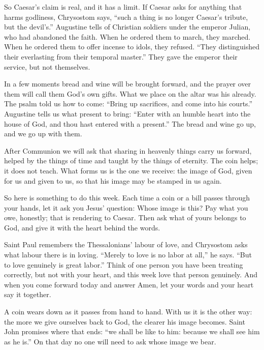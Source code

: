 So Caesar's claim is real, and it has a limit. If Caesar asks for anything
that harms godliness, Chrysostom says, ``such a thing is no longer Caesar's
tribute, but the devil's.'' Augustine tells of Christian soldiers under the
emperor Julian, who had abandoned the faith. When he ordered them to march,
they marched. When he ordered them to offer incense to idols, they refused.
``They distinguished their everlasting from their temporal master.'' They gave
the emperor their service, but not themselves.

\bigskip

In a few moments bread and wine will be brought forward, and the prayer over
them will call them God's own gifts. What we place on the altar was his
already. The psalm told us how to come: ``Bring up
sacrifices, and come into his courts.'' Augustine tells us what present to
bring: ``Enter with an humble heart into the house of God, and thou hast
entered with a present.'' The bread and wine go up, and we go up with them.

After Communion we will ask that sharing in heavenly things carry us forward,
helped by the things of time and taught by the things of eternity. The coin
helps; it does not teach. What forms us is the one we receive: the image of
God, given for us and given to us, so that his image may be stamped in us
again.

\bigskip

So here is something to do this week. Each time a coin or a bill passes
through your hands, let it ask you Jesus' question: Whose image is this? Pay
what you owe, honestly; that is rendering to Caesar. Then ask what of yours
belongs to God, and give it with the heart behind the words.

Saint Paul remembers the Thessalonians' labour of love, and Chrysostom asks
what labour there is in loving. ``Merely to love is no labor at all,'' he
says. ``But to love genuinely is great labor.'' Think of one person you have been treating correctly, but not with
your heart, and this week love that person genuinely. And when you come
forward today and answer Amen, let your words and your heart say it together.

A coin wears down as it passes from hand to hand. With us it is the other way:
the more we give ourselves back to God, the clearer his image becomes. Saint
John promises where that ends: ``we shall be like to him: because we shall see
him as he is.'' On that day no one will need to ask whose image we bear.
